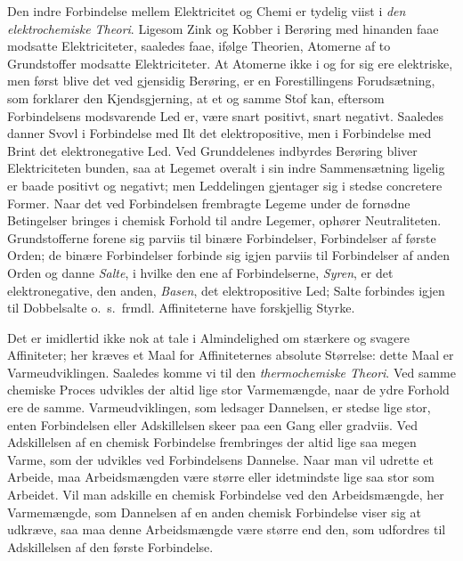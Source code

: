\documentclass[12pt]{book}
\newcommand{\apage}[1]{\marginnote{\footnotesize\textit{[#1]}}}
\begin{document}
Den indre Forbindelse mellem Elektricitet og Chemi er tydelig viist i \emph{den
elektrochemiske Theori}. Ligesom Zink og Kobber i Berøring med hinanden faae
modsatte Elektriciteter, saaledes faae, ifølge Theorien, Atomerne af to
Grundstoffer modsatte Elektriciteter. At Atomerne ikke i og for sig ere
elektriske, men først blive det ved gjensidig Berøring, er en
Forestillingens Forudsætning, som forklarer den Kjendsgjerning, at et og
samme Stof kan, eftersom Forbindelsens modsvarende Led er, være snart
positivt, snart negativt. Saaledes danner Svovl i Forbindelse med Ilt det
elektropositive, men i Forbindelse med Brint det elektronegative Led. Ved
Grunddelenes indbyrdes Berøring bliver Elektriciteten bunden, saa at
Legemet overalt i sin indre Sammensætning ligelig er baade positivt og
negativt; men Leddelingen gjentager sig i stedse concretere Former. Naar
det ved Forbindelsen frembragte Legeme under de fornødne Betingelser
bringes i chemisk Forhold til andre Legemer, ophører Neutraliteten.
Grundstofferne forene sig parviis til binære Forbindelser, Forbindelser af
første Orden; de binære Forbindelser forbinde sig igjen parviis til
Forbindelser af anden Orden og danne \emph{Salte}, i hvilke den ene af
Forbindelserne, \emph{Syren}, er det elektronegative, den anden, \emph{Basen}, det
elektropositive Led; Salte \apage{154} forbindes igjen til Dobbelsalte o.\ s.\ frmdl.
Affiniteterne have forskjellig Styrke.

Det er imidlertid ikke nok at tale i Almindelighed om stærkere og svagere
Affiniteter; her kræves et Maal for Affiniteternes absolute Størrelse:
dette Maal er Varmeudviklingen. Saaledes komme vi til den \emph{thermochemiske
Theori}. Ved samme chemiske Proces udvikles der altid lige stor
Varmemængde, naar de ydre Forhold ere de samme. Varmeudviklingen, som
ledsager Dannelsen, er stedse lige stor, enten Forbindelsen eller
Adskillelsen skeer paa een Gang eller gradviis. Ved Adskillelsen af en
chemisk Forbindelse frembringes der altid lige saa megen Varme, som der
udvikles ved Forbindelsens Dannelse. Naar man vil udrette et Arbeide, maa
Arbeidsmængden være større eller idetmindste lige saa stor som Arbeidet.
Vil man adskille en chemisk Forbindelse ved den Arbeidsmængde, her
Varmemængde, som Dannelsen af en anden chemisk Forbindelse viser sig at
udkræve, saa maa denne Arbeidsmængde være større end den, som udfordres til
Adskillelsen af den første Forbindelse.
\end{document}

